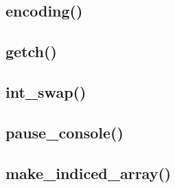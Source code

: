 \documentclass[12pt, a4paper]{article}
\begin{document}
\subsection{encoding()}







\subsection{getch()}







\subsection{int\_swap()}







\subsection{pause\_console()}







\subsection{make\_indiced\_array()}




\end{document}
